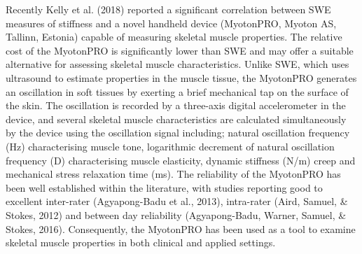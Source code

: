 \documentclass[
  english,
  man,floatsintext]{apa6}
\begin{document}
Recently Kelly et al. (2018) reported a significant correlation between SWE measures of stiffness and a novel handheld device (MyotonPRO, Myoton AS, Tallinn, Estonia) capable of measuring skeletal muscle properties.
The relative cost of the MyotonPRO is significantly lower than SWE and may offer a suitable alternative for assessing skeletal muscle characteristics.
Unlike SWE, which uses ultrasound to estimate properties in the muscle tissue, the MyotonPRO generates an oscillation in soft tissues by exerting a brief mechanical tap on the surface of the skin.
The oscillation is recorded by a three-axis digital accelerometer in the device, and several skeletal muscle characteristics are calculated simultaneously by the device using the oscillation signal including;
natural oscillation frequency (Hz) characterising muscle tone,
logarithmic decrement of natural oscillation frequency (D) characterising muscle elasticity, dynamic stiffness (N/m)
creep and
mechanical stress relaxation time (ms).
The reliability of the MyotonPRO has been well established within the literature, with studies reporting good to excellent inter-rater (Agyapong-Badu et al., 2013), intra-rater (Aird, Samuel, \& Stokes, 2012) and between day reliability (Agyapong-Badu, Warner, Samuel, \& Stokes, 2016).
Consequently, the MyotonPRO has been used as a tool to examine skeletal muscle properties in both clinical and applied settings.
\end{document}
